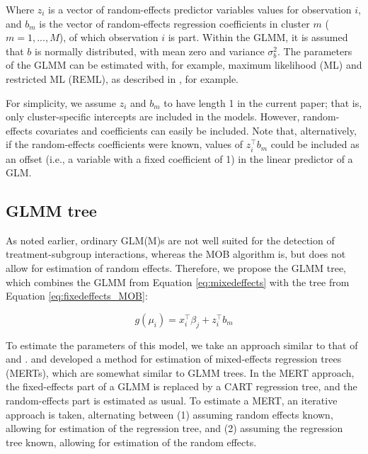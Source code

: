 \documentclass[nobf,doc]{apa}
\begin{document}
Where $z_{i}$ is a vector of random-effects predictor variables values for observation $i$, and $b_{m}$ is the vector of random-effects regression coefficients in cluster $m$ ($m=1,...,M$), of which observation $i$ is part. Within the GLMM, it is assumed that $b$ is normally distributed, with mean zero and variance $\sigma^{2}_{b}$. The parameters of the GLMM can be estimated with, for example, maximum likelihood (ML) and restricted ML (REML), as described in , for example.  

For simplicity, we assume $z_{i}$ and $b_{m}$ to have length 1 in the current paper; that is, only cluster-specific intercepts are included in the models. However, random-effects covariates and coefficients can easily be included. Note that, alternatively, if the random-effects coefficients were known, values of $z_{i}^{\top}b_{m}$ could be included as an offset (i.e., a variable with a fixed coefficient of 1) in the linear predictor of a GLM.



\subsection{GLMM tree}

As noted earlier, ordinary GLM(M)s are not well suited for the detection of treatment-subgroup interactions, whereas the MOB algorithm is, but does not allow for estimation of random effects. Therefore, we propose the GLMM tree, which combines the GLMM from Equation \ref{eq:mixedeffects} with the tree from Equation \ref{eq:fixedeffects_MOB}: 

\begin{equation}
\label{eq:glimmertree}
	g(\mu_{i}) = x_{i}^{\top}\beta_{j} + z_{i}^{\top}b_{m}
\end{equation}

To estimate the parameters of this model, we take an approach similar to that of  and .  and  developed a method for estimation of mixed-effects regression trees (MERTs), which are somewhat similar to GLMM trees. In the MERT approach, the fixed-effects part of a GLMM is replaced by a CART regression tree, and the random-effects part is estimated as usual. To estimate a MERT, an iterative approach is taken, alternating between (1) assuming random effects known, allowing for estimation of the regression tree, and (2) assuming the regression tree known, allowing for estimation of the random effects. 
\end{document}
